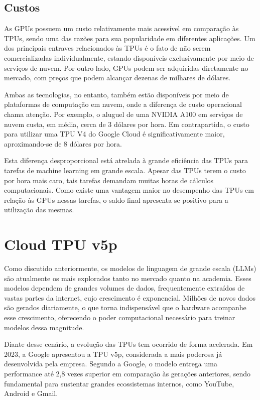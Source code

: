 \documentclass{report}
\begin{document}
\section{Custos}

\setlength{\parskip}{1em}\hspace{0.5cm} As GPUs possuem um custo relativamente mais acessível em comparação às TPUs, sendo uma das razões para sua popularidade em diferentes aplicações. Um dos principais entraves relacionados às TPUs é o fato de não serem comercializadas individualmente, estando disponíveis exclusivamente por meio de serviços de nuvem. Por outro lado, GPUs podem ser adquiridas diretamente no mercado, com preços que podem alcançar dezenas de milhares de dólares.

Ambas as tecnologias, no entanto, também estão disponíveis por meio de plataformas de computação em nuvem, onde a diferença de custo operacional chama atenção. Por exemplo, o aluguel de uma NVIDIA A100 em serviços de nuvem custa, em média, cerca de 3 dólares por hora. Em contrapartida, o custo para utilizar uma TPU V4 do Google Cloud é significativamente maior, aproximando-se de 8 dólares por hora.

Esta diferença desproporcional está atrelada à grande eficiência das TPUs para tarefas de machine learning em grande escala. Apesar das TPUs terem o custo por hora mais caro, tais tarefas demandam muitas horas de cálculos computacionais. Como existe uma vantagem maior no desempenho das TPUs em relação às GPUs nessas tarefas, o saldo final apresenta-se positivo para a utilização das mesmas.

\chapter{Cloud TPU v5p}

\setlength{\parskip}{1em}\hspace{0.5cm} Como discutido anteriormente, os modelos de linguagem de grande escala (LLMs) são atualmente os mais explorados tanto no mercado quanto na academia. Esses modelos dependem de grandes volumes de dados, frequentemente extraídos de vastas partes da internet, cujo crescimento é exponencial. Milhões de novos dados são gerados diariamente, o que torna indispensável que o hardware acompanhe esse crescimento, oferecendo o poder computacional necessário para treinar modelos dessa magnitude.

Diante desse cenário, a evolução das TPUs tem ocorrido de forma acelerada. Em 2023, a Google apresentou a TPU v5p, considerada a mais poderosa já desenvolvida pela empresa. Segundo a Google, o modelo entrega uma performance até 2,8 vezes superior em comparação às gerações anteriores, sendo fundamental para sustentar grandes ecossistemas internos, como YouTube, Android e Gmail.
\end{document}
